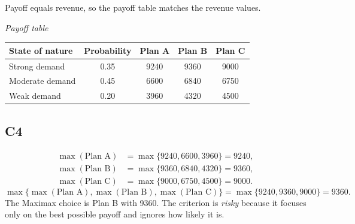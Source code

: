 \begin{ExamProblems}
\begin{center}
		\end{center}
		Payoff equals revenue, so the payoff table matches the revenue values.
		\begin{center}
			\textit{Payoff table} \\
			\begin{tabular}{l c c c c}
				\toprule
				State of nature & Probability & Plan A & Plan B & Plan C \\
				\midrule
				Strong demand & 0.35 & 9240 & 9360 & 9000 \\
				Moderate demand & 0.45 & 6600 & 6840 & 6750 \\
				Weak demand & 0.20 & 3960 & 4320 & 4500 \\
				\bottomrule
		\end{tabular}
		\end{center}

		\subsection*{C4}
		\[
		\begin{aligned}
		\max(\text{Plan A}) &= \max\{9240,6600,3960\} = 9240,\\
		\max(\text{Plan B}) &= \max\{9360,6840,4320\} = 9360,\\
		\max(\text{Plan C}) &= \max\{9000,6750,4500\} = 9000.
		\end{aligned}
		\]
		\[
		\max\{\max(\text{Plan A}), \max(\text{Plan B}), \max(\text{Plan C})\}
		= \max\{9240, 9360, 9000\}
		= 9360.
		\]
		The Maximax choice is Plan B with 9360. The criterion is \emph{risky} because it focuses only on the best possible payoff and ignores how likely it is.


\end{ExamProblems}
